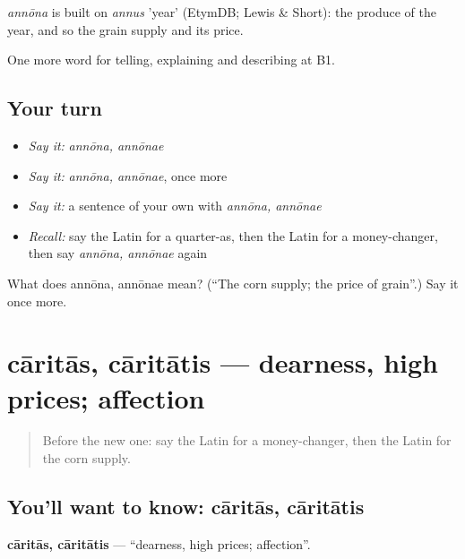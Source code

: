 \begin{cousinweb}
\emph{annōna} is built on \emph{annus} 'year' (EtymDB; Lewis \& Short): the produce of the year, and so the grain supply and its price.
\end{cousinweb}

\begin{grammarlens}[title={What you've built}]
One more word for telling, explaining and describing at B1.
\end{grammarlens}

\subsection*{Your turn}
\begin{itemize}
\raggedright
  \item \emph{Say it:} \emph{annōna, annōnae}
  \item \emph{Say it:} \emph{annōna, annōnae}, once more
  \item \emph{Say it:} a sentence of your own with \emph{annōna, annōnae}
  \item \emph{Recall:} say the Latin for a quarter-as, then the Latin for a money-changer, then say \emph{annōna, annōnae} again
\end{itemize}

\begin{tcolorbox}[breakable,colback=teal!4,colframe=teal!35!black,title={Before you move on}]
What does annōna, annōnae mean? (\textquotedblleft{}The corn supply; the price of grain\textquotedblright{}.) Say it once more.
\end{tcolorbox}
\section[cāritās, cāritātis]{cāritās, cāritātis — dearness, high prices; affection}

\label{lesson:LA-C466-caritas}



\begin{quote}
Before the new one: say the Latin for a money-changer, then the Latin for the corn supply.
\end{quote}

\subsection*{You'll want to know: cāritās, cāritātis}
\textbf{cāritās, cāritātis} — \textquotedblleft{}dearness, high prices; affection\textquotedblright{}.

